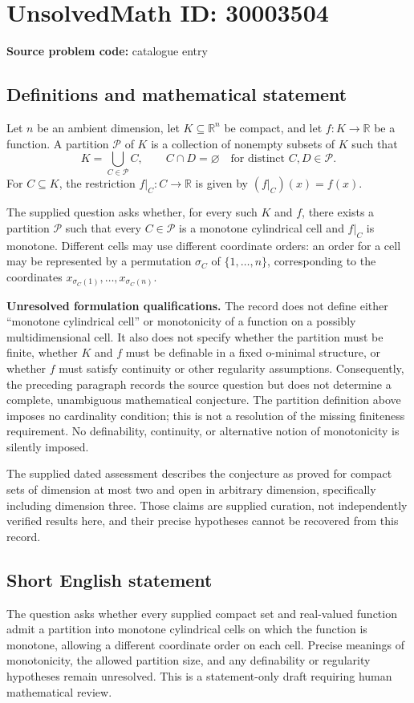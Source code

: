\documentclass[11pt]{article}
\newcommand{\R}{\mathbb{R}}
\begin{document}
\section*{UnsolvedMath ID: 30003504}
\textbf{Source problem code:} catalogue entry
\subsection{Definitions and mathematical statement}
Let \(n\) be an ambient dimension, let \(K\subseteq\R^n\) be compact, and let \(f:K\to\R\) be a function. A partition \(\mathcal P\) of \(K\) is a collection of nonempty subsets of \(K\) such that
\[
K=\bigcup_{C\in\mathcal P}C,
\qquad C\cap D=\varnothing\quad\text{for distinct }C,D\in\mathcal P.
\]
For \(C\subseteq K\), the restriction \(f|_C:C\to\R\) is given by \((f|_C)(x)=f(x)\).

The supplied question asks whether, for every such \(K\) and \(f\), there exists a partition \(\mathcal P\) such that every \(C\in\mathcal P\) is a monotone cylindrical cell and \(f|_C\) is monotone. Different cells may use different coordinate orders: an order for a cell may be represented by a permutation \(\sigma_C\) of \(\{1,\ldots,n\}\), corresponding to the coordinates \(x_{\sigma_C(1)},\ldots,x_{\sigma_C(n)}\).

\textbf{Unresolved formulation qualifications.} The record does not define either ``monotone cylindrical cell'' or monotonicity of a function on a possibly multidimensional cell. It also does not specify whether the partition must be finite, whether \(K\) and \(f\) must be definable in a fixed o-minimal structure, or whether \(f\) must satisfy continuity or other regularity assumptions. Consequently, the preceding paragraph records the source question but does not determine a complete, unambiguous mathematical conjecture. The partition definition above imposes no cardinality condition; this is not a resolution of the missing finiteness requirement. No definability, continuity, or alternative notion of monotonicity is silently imposed.

The supplied dated assessment describes the conjecture as proved for compact sets of dimension at most two and open in arbitrary dimension, specifically including dimension three. Those claims are supplied curation, not independently verified results here, and their precise hypotheses cannot be recovered from this record.
\subsection{Short English statement}
The question asks whether every supplied compact set and real-valued function admit a partition into monotone cylindrical cells on which the function is monotone, allowing a different coordinate order on each cell. Precise meanings of monotonicity, the allowed partition size, and any definability or regularity hypotheses remain unresolved. This is a statement-only draft requiring human mathematical review.
\end{document}
